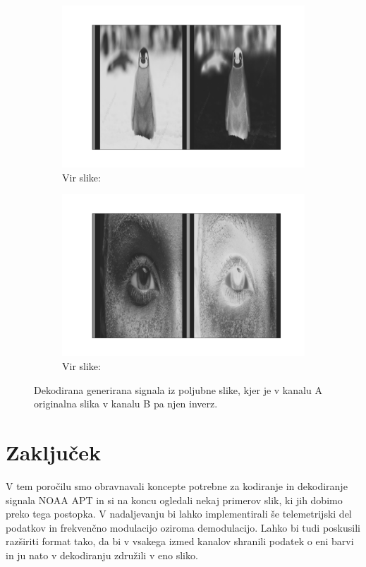 \documentclass{article}
\begin{document}
\begin{figure}[H]
    \centering
    \begin{subfigure}[b]{0.49\textwidth}
        \centering
        \includegraphics[width=\textwidth]{penguin.pdf}
		\caption{Vir slike: \cite{penguin}}
    \end{subfigure}
    \hfill
    \begin{subfigure}[b]{0.49\textwidth}
        \centering
        \includegraphics[width=\textwidth]{eye.pdf}
		\caption{Vir slike: \cite{eye}}
    \end{subfigure}
	\caption{Dekodirana generirana signala iz poljubne slike, kjer je v kanalu A originalna slika v kanalu B pa njen inverz.}
    \label{fig:out_example1}
\end{figure}
\section{Zaključek}
V tem poročilu smo obravnavali koncepte potrebne za kodiranje in dekodiranje signala NOAA APT in si na koncu ogledali nekaj primerov slik, ki jih dobimo preko tega postopka. V nadaljevanju bi lahko implementirali še telemetrijski del podatkov in frekvenčno modulacijo oziroma demodulacijo. Lahko bi tudi poskusili razširiti format tako, da bi v vsakega izmed kanalov shranili podatek o eni barvi in ju nato v dekodiranju združili v eno sliko.


\printbibliography[heading=bibnumbered]
\end{document}
